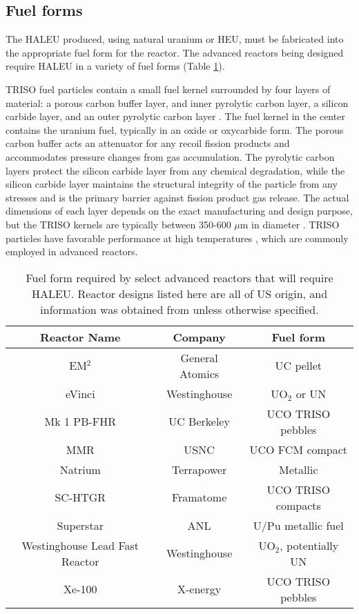 \subsection{Fuel forms}
The \gls{HALEU} produced, using natural uranium or \gls{HEU}, must be 
fabricated into the appropriate fuel form for the reactor.
The advanced reactors being designed require \gls{HALEU} in a 
variety of fuel forms (Table \ref{tab:fuel_forms}).  

\gls{TRISO} fuel particles contain 
a small fuel kernel surrounded by four layers of material: a porous carbon 
buffer layer, and inner pyrolytic carbon layer, a silicon carbide layer, 
and an outer pyrolytic carbon layer \cite{demkowicz_coated_2019}. The fuel 
kernel in the center contains the uranium fuel, typically in an oxide 
or oxycarbide form. The porous carbon buffer acts an attenuator for any 
recoil fission products and accommodates pressure changes from gas 
accumulation.
The pyrolytic carbon layers protect the silicon carbide layer from 
any chemical degradation, while the silicon carbide layer maintains the 
structural integrity of the particle from any stresses and is the primary 
barrier against fission product gas release. The actual dimensions 
of each layer depends on the exact manufacturing and design purpose, but 
the \gls{TRISO} kernels are typically between 350-600 $\mu$m in diameter 
\cite{demkowicz_coated_2019}. \gls{TRISO} particles have 
favorable performance at high temperatures 
\cite{demkowicz_coated_2019}, which are commonly employed in advanced 
reactors. 

\begin{table}
    \centering
    \caption{Fuel form required by select advanced reactors that will 
    require \gls{HALEU}. Reactor designs listed here are all of US origin, 
    and information was obtained from \cite{hussain_advances_2018} unless 
    otherwise specified.}
    \label{tab:fuel_forms}
    \begin{tabular}{c c c}
        \hline
        Reactor Name & Company & Fuel form \\\hline 
        EM$^2$ & General Atomics & UC pellet \\
        eVinci & Westinghouse & UO$_2$ or UN \\
        Mk 1 PB-FHR & UC Berkeley & UCO TRISO pebbles\\
        \gls{MMR} \cite{mitchell_usnc_2020} & \gls{USNC} & UCO FCM compact\\
        Natrium & Terrapower & Metallic \\
        SC-HTGR & Framatome & UCO TRISO compacts \\
        Superstar  & \gls{ANL} & U/Pu metallic fuel \\
        Westinghouse Lead Fast Reactor  & Westinghouse & UO$_2$, potentially UN \\
        Xe-100 \cite{harlan_x-energy_2018} & X-energy & UCO TRISO pebbles \\
        \hline        
        
    \end{tabular}
\end{table}

